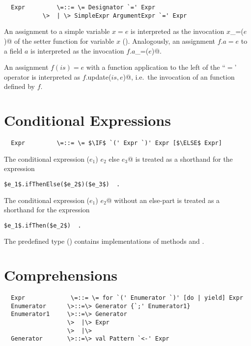 \documentclass[11pt]{report}
\renewcommand{\todo}[1]{}
\begin{document}
\syntax\begin{verbatim}
  Expr	       \=::= \= Designator `=' Expr
	       \>  | \> SimpleExpr ArgumentExpr `=' Expr
\end{verbatim}

An assignment to a simple variable $x = e$ is interpreted as the invocation
\verb@$x$_=($e$)@ of the setter function for variable
$x$ ().
Analogously, an assignment $f.a = e$ to a field $a$ is interpreted
as the invocation \verb@$f.a$_=($e$)@.

An assignment $f(is) = e$ with a function application to the
left of the ``$=$' operator is interpreted as \verb@$f$.update($is, e$)@, i.e.\
the invocation of an \verb@update@ function defined by $f$.

\section{Conditional Expressions}

\syntax\begin{verbatim}
  Expr	       \=::= \= $\IF$ `(' Expr `)' Expr [$\ELSE$ Expr]
\end{verbatim}

The conditional expression \verb@if ($e_1$) $e_2$ else $e_3$@ is treated as
a shorthand for the expression
\begin{verbatim}
$e_1$.ifThenElse($e_2$)($e_3$)  .
\end{verbatim}
The conditional expression \verb@if ($e_1$) $e_2$@ without an
else-part is treated as a shorthand for the expression
\begin{verbatim}
$e_1$.ifThen($e_2$)  .
\end{verbatim}
The predefined type \verb@Boolean@ ()
contains implementations of
methods \verb@ifThen@ and \verb@ifThenElse@.

\section{Comprehensions}

\todo{change syntax; treat refulatble patterns as filters}

\syntax\begin{verbatim}
  Expr	           \=::= \= for `(' Enumerator `)' [do | yield] Expr
  Enumerator      \>::=\> Generator {`;' Enumerator1}
  Enumerator1     \>::=\> Generator
                  \>  |\> Expr
                  \>  |\>
  Generator       \>::=\> val Pattern `<-' Expr
\end{verbatim}
\end{document}
